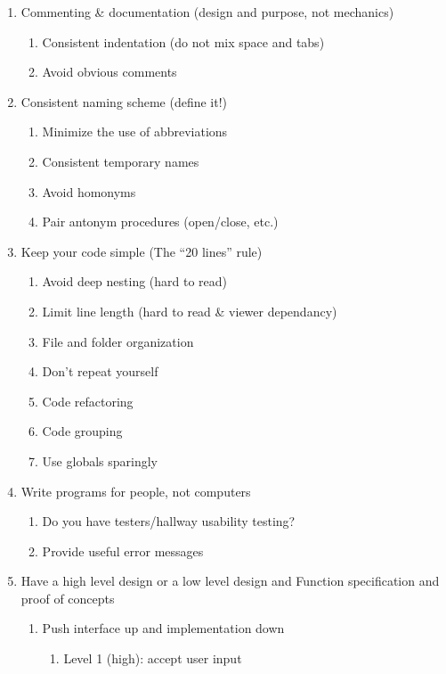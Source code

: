 \documentclass[10pt,letter,twoside]{report}
\begin{document}
		\begin{singlespacing}		\small
		\begin{enumerate}
			\item Commenting \& documentation (design and purpose, not mechanics)
			\begin{enumerate}
				\item Consistent indentation (do not mix space and tabs)
				\item Avoid obvious comments
			\end{enumerate}
			\item Consistent naming scheme (define it!)
			\begin{enumerate}
				\item Minimize the use of abbreviations
				\item Consistent temporary names
				\item Avoid homonyms
				\item Pair antonym procedures (open/close, etc.)
			\end{enumerate}
			\item Keep your code simple (The “20 lines” rule)
			\begin{enumerate}
				\item Avoid deep nesting (hard to read)
				\item Limit line length (hard to read \& viewer dependancy)
				\item File and folder organization
				\item Don’t repeat yourself
				\item Code refactoring
				\item Code grouping
				\item Use globals sparingly
			\end{enumerate}
			\item Write programs for people, not computers
			\begin{enumerate}
				\item Do you have testers/hallway usability testing?
				\item Provide useful error messages
			\end{enumerate}
			\item Have a high level design or a low level design and Function specification and proof of concepts
			\begin{enumerate}
				\item Push interface up and implementation down
				\begin{enumerate}
					\item Level 1 (high): accept user input

\end{enumerate}
\end{enumerate}
\end{enumerate}
\end{singlespacing}
\end{document}
